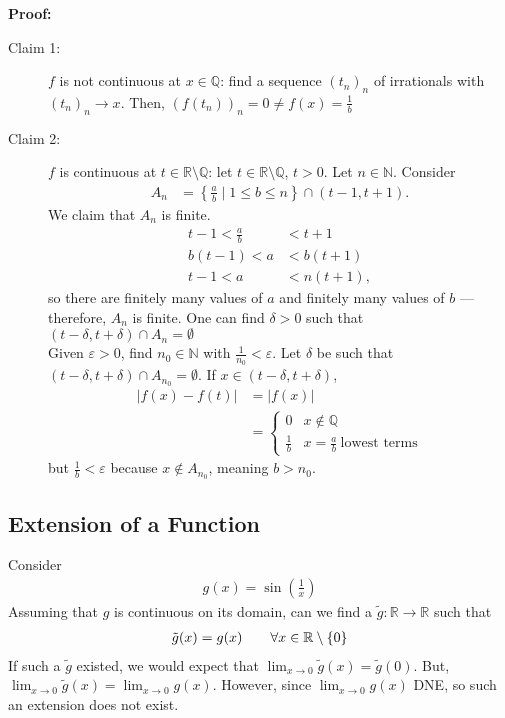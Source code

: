 \documentclass[10pt]{extarticle}
\newcommand{\N}{\mathbb{N}}
\newcommand{\Q}{\mathbb{Q}}
\newcommand{\R}{\mathbb{R}}
\begin{document}
    \textbf{Proof:}
    \begin{description}
      \item[Claim 1:] $f$ is not continuous at $x\in\Q$: find a sequence $(t_n)_n$ of irrationals with $(t_n)_n \rightarrow x$. Then, $(f(t_n))_n = 0\neq f(x) = \frac{1}{b}$
      \item[Claim 2:] $f$ is continuous at $t\in \R\setminus\Q$: let $t\in \R\setminus\Q$, $t > 0$. Let $n\in\N$. Consider
        \begin{align*}
          A_n &= \left\{\frac{a}{b} \mid 1 \leq b\leq n\right\} \cap (t-1,t+1).
        \end{align*}
        We claim that $A_n$ is finite.
        \begin{align*}
          t-1 < \frac{a}{b} &< t+1\\
          b(t-1) < a &< b(t+1)\\
          t-1 < a &< n(t+1),
        \end{align*}
        so there are finitely many values of $a$ and finitely many values of $b$ --- therefore, $A_n$ is finite. One can find $\delta > 0$ such that $(t-\delta,t+\delta) \cap A_n = \emptyset$\\

        Given $\varepsilon > 0$, find $n_{0}\in \N$ with $\frac{1}{n_0} < \varepsilon$. Let $\delta$ be such that $(t-\delta,t+\delta) \cap A_{n_0} = \emptyset$. If $x\in (t-\delta,t+\delta)$,
        \begin{align*}
          |f(x) - f(t)| &= |f(x)|\\
                        &= \begin{cases}
                          0 & x\notin\Q\\
                          \frac{1}{b} & x = \frac{a}{b}~\text{lowest terms}
                        \end{cases}
        \end{align*}
        but $\frac{1}{b} < \varepsilon$ because $x\notin A_{n_0}$, meaning $b > n_0$.
    \end{description}
  \subsection{Extension of a Function}%
    Consider
    \begin{align*}
      g(x) = \sin\left(\frac{1}{x}\right) \tag*{$x\neq 0$}
    \end{align*}
    Assuming that $g$ is continuous on its domain, can we find a $\tilde{g}: \R\rightarrow\R$ such that
    \begin{align*}
      \tilde{g}(x) = g(x) \tag*{$\forall x\in\R\setminus\{0\}$}
    \end{align*}
    If such a $\tilde{g}$ existed, we would expect that $\lim_{x\rightarrow 0}\tilde{g}(x) = \tilde{g}(0)$. But, $\lim_{x\rightarrow 0}\tilde{g}(x) = \lim_{x\rightarrow 0}g(x)$. However, since $\lim_{x\rightarrow 0}g(x)$ DNE, so such an extension does not exist.\\
\end{document}
